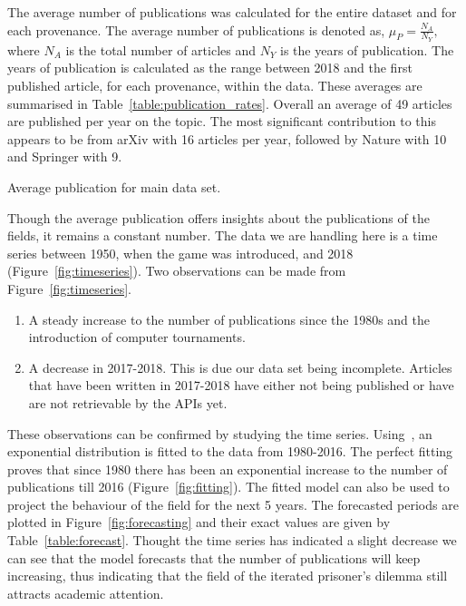 \documentclass{article}
\theoremstyle{definition}
\begin{document}
The average number of publications was calculated for the entire dataset and for
each provenance. The average number of publications is denoted as,
\(\mu_P = \frac{N_A}{N_Y},\) where \(N_A\) is the total number of articles and
\(N_Y\) is the years of publication. The years of publication is calculated as
the range between 2018 and the first published article, for each provenance,
within the data.
These averages are summarised in Table~\ref{table:publication_rates}.
Overall an average of 49 articles are published per year on the topic. The most
significant contribution to this appears to be from arXiv with 16 articles per year,
followed by Nature with 10 and Springer with 9.

\begin{table}[!hbtp]
    \begin{center}
    
    \end{center}
    \caption{Average publication for main data set.} %
    \label{table:publication_rates}
\end{table}

Though the average publication offers insights about the publications of the
fields, it remains a constant number. The data we are handling here is a time
series between 1950, when the game was introduced, and 2018 (Figure~\ref{fig:timeseries}). 
Two observations can be made from Figure~\ref{fig:timeseries}.

\begin{enumerate}
    \item A steady increase to the number of publications since the 1980s
    and the introduction of computer tournaments.
    \item A decrease in 2017-2018. This is due our data set being incomplete.
    Articles that have been written in 2017-2018 have either not being published
    or have are not retrievable by the APIs yet.
\end{enumerate}

These observations can be confirmed by studying the time series.
Using~\cite{scipy}, an exponential distribution is fitted to
the data from 1980-2016. The perfect fitting proves that since 1980 there has
been an exponential increase to the number of publications till 2016 (Figure~\ref{fig:fitting}).
The fitted model can also be used to project the behaviour of the field for the next 
5 years. The forecasted periods are plotted in Figure~\ref{fig:forecasting} and
their exact values are given by Table~\ref{table:forecast}. Thought the time series
has indicated a slight decrease we can see that the model forecasts that the number
of publications will keep increasing, thus indicating that the field of the iterated
prisoner's dilemma still attracts academic attention.
\end{document}
